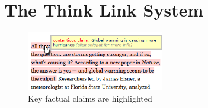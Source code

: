 \documentclass{chi2009}
\begin{document}
%

\section{The Think Link System}

\begin{figure}[tb]
	\begin{center}
	\includegraphics[width=6cm]{../screenshots/highlight_crop.png}
	\caption{Key factual claims are highlighted}
	\label{highlight}
	\end{center}
\end{figure}
\end{document}
